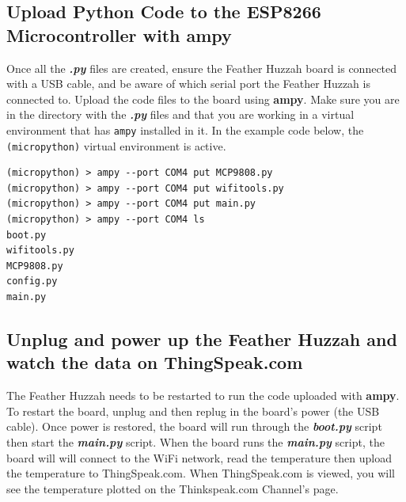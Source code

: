 \documentclass{book}
\begin{document}
    
        \subsection{\texorpdfstring{Upload Python Code to the ESP8266
Microcontroller with
\textbf{ampy}}{Upload Python Code to the ESP8266 Microcontroller with ampy}}\label{upload-python-code-to-the-esp8266-microcontroller-with-ampy}
    




    
        Once all the \textbf{\emph{.py}} files are created, ensure the Feather
Huzzah board is connected with a USB cable, and be aware of which serial
port the Feather Huzzah is connected to. Upload the code files to the
board using \textbf{ampy}. Make sure you are in the directory with the
\textbf{\emph{.py}} files and that you are working in a virtual
environment that has \lstinline!ampy! installed in it. In the example
code below, the \lstinline!(micropython)! virtual environment is active.

\begin{lstlisting}
(micropython) > ampy --port COM4 put MCP9808.py
(micropython) > ampy --port COM4 put wifitools.py
(micropython) > ampy --port COM4 put main.py
(micropython) > ampy --port COM4 ls
boot.py
wifitools.py
MCP9808.py
config.py
main.py
\end{lstlisting}
    




    
        \subsection{Unplug and power up the Feather Huzzah and watch the data on
ThingSpeak.com}\label{unplug-and-power-up-the-feather-huzzah-and-watch-the-data-on-thingspeak.com}
    




    
        The Feather Huzzah needs to be restarted to run the code uploaded with
\textbf{ampy}. To restart the board, unplug and then replug in the
board's power (the USB cable). Once power is restored, the board will
run through the \textbf{\emph{boot.py}} script then start the
\textbf{\emph{main.py}} script. When the board runs the
\textbf{\emph{main.py}} script, the board will will connect to the WiFi
network, read the temperature then upload the temperature to
ThingSpeak.com. When ThingSpeak.com is viewed, you will see the
temperature plotted on the Thinkspeak.com Channel's page.
    
\end{document}

